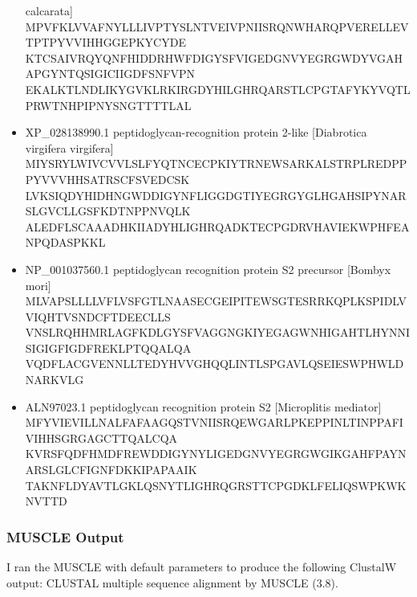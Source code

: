 \documentclass[]{article}
\begin{document}
\begin{itemize}
  calcarata{]}
  MPVFKLVVAFNYLLLIVPTYSLNTVEIVPNIISRQNWHARQPVERELLEVTPTPYVVIHHGGEPKYCYDE
  KTCSAIVRQYQNFHIDDRHWFDIGYSFVIGEDGNVYEGRGWDYVGAHAPGYNTQSIGICIIGDFSNFVPN
  EKALKTLNDLIKYGVKLRKIRGDYHILGHRQARSTLCPGTAFYKYVQTLPRWTNHPIPNYSNGTTTTLAL
\item
  XP\_028138990.1 peptidoglycan-recognition protein 2-like {[}Diabrotica
  virgifera virgifera{]}
  MIYSRYLWIVCVVLSLFYQTNCECPKIYTRNEWSARKALSTRPLREDPPPYVVVHHSATRSCFSVEDCSK
  LVKSIQDYHIDHNGWDDIGYNFLIGGDGTIYEGRGYGLHGAHSIPYNARSLGVCLLGSFKDTNPPNVQLK
  ALEDFLSCAAADHKIIADYHLIGHRQADKTECPGDRVHAVIEKWPHFEANPQDASPKKL
\item
  NP\_001037560.1 peptidoglycan recognition protein S2 precursor
  {[}Bombyx mori{]}
  MLVAPSLLLLVFLVSFGTLNAASECGEIPITEWSGTESRRKQPLKSPIDLVVIQHTVSNDCFTDEECLLS
  VNSLRQHHMRLAGFKDLGYSFVAGGNGKIYEGAGWNHIGAHTLHYNNISIGIGFIGDFREKLPTQQALQA
  VQDFLACGVENNLLTEDYHVVGHQQLINTLSPGAVLQSEIESWPHWLDNARKVLG
\item
  ALN97023.1 peptidoglycan recognition protein S2 {[}Microplitis
  mediator{]}
  MFYVIEVILLNALFAFAAGQSTVNIISRQEWGARLPKEPPINLTINPPAFIVIHHSGRGAGCTTQALCQA
  KVRSFQDFHMDFREWDDIGYNYLIGEDGNVYEGRGWGIKGAHFPAYNARSLGLCFIGNFDKKIPAPAAIK
  TAKNFLDYAVTLGKLQSNYTLIGHRQGRSTTCPGDKLFELIQSWPKWKNVTTD
\end{itemize}

\subsubsection{MUSCLE Output}\label{muscle-output}

I ran the MUSCLE with default parameters to produce the following
ClustalW output: CLUSTAL multiple sequence alignment by MUSCLE (3.8).
\end{document}

